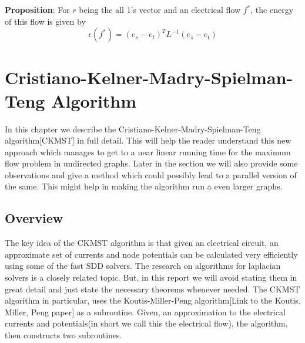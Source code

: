 \documentclass[BTech]{iitmdiss}
\begin{document}
		   \textbf{Proposition}: For $r$ being the all 1's vector and an electrical flow $f^{\ast}$, the energy of this flow is given by
		      $$\epsilon(f^{\ast}) = (e_s - e_t)^T L^{-1} (e_s-e_t)$$
		
		
		
	      
	      
	 \chapter{Cristiano-Kelner-Madry-Spielman-Teng Algorithm}
	    In this chapter we describe the Cristiano-Kelner-Madry-Spielman-Teng algorithm[CKMST] in full detail. This will help the reader understand
	 this new approach which manages to get to a near linear running time for the maximum flow problem in undirected graphs. Later in the section
	 we will also provide some observations and give a method which could possibly lead to a parallel version of the same. This might help in 
	 making the algorithm run a even larger graphs.\\
	 
	 \section{Overview}
	    The key idea of the CKMST algorithm is that given an electrical circuit, an approximate set of currents and node potentials can be calculated
	 very efficiently using some of the fast SDD solvers. The research on algorithms for laplacian solvers is a closely related topic. But, 
	 in this report we will avoid stating them in great detail and just state the necessary theorems whenever needed. The CKMST algorithm in
	 particular, uses the Koutis-Miller-Peng algorithm[Link to the Koutis, Miller, Peng paper] as a subroutine. Given, an approximation to the 
	 electrical currents and potentials(in short we call this the electrical flow), the algorithm, then constructs two subroutines. 
	 
\end{document}

